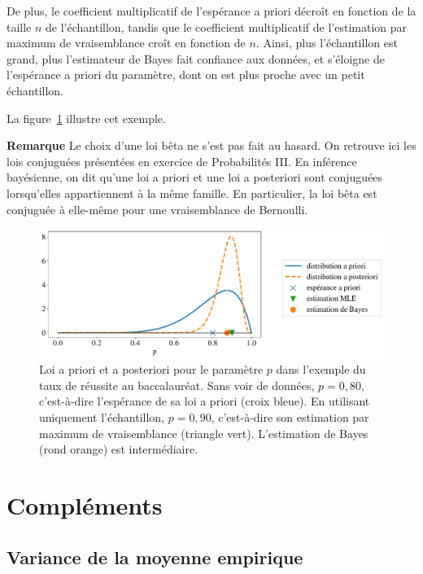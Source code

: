\begin{exemple}
  De plus, le coefficient multiplicatif de l'espérance a priori décroît en
  fonction de la taille $n$ de l'échantillon, tandis que le coefficient
  multiplicatif de l'estimation par maximum de vraisemblance croît en fonction
  de $n$. Ainsi, plus l'échantillon est grand, plus l'estimateur de Bayes fait
  confiance aux données, et s'éloigne de l'espérance a priori du paramètre,
  dont on est plus proche avec un petit échantillon.

  La figure~\ref{fig:bayes_estimate} illustre cet exemple.

  \textbf{Remarque} Le choix d'une loi bêta ne s'est pas fait au hasard. On
  retrouve ici les lois conjuguées présentées en exercice de Probabilités
  III. En inférence bayésienne, on dit qu'une loi a priori et une loi a
  posteriori sont conjuguées lorsqu'elles appartiennent à la même famille. En
  particulier, la loi bêta est conjuguée à elle-même pour une vraisemblance de
  Bernoulli.
\end{exemple}

\begin{figure}[h]
  \centering
  \includegraphics[width=\textwidth]{figures/estimation/bayes_estimate}
  \caption{Loi a priori et a posteriori pour le paramètre $p$ dans l'exemple du
    taux de réussite au baccalauréat. Sans voir de données, $p=0,80$,
    c'est-à-dire l'espérance de sa loi a priori (croix bleue). En utilisant
    uniquement l'échantillon, $p=0,90$, c'est-à-dire son estimation par maximum
    de vraisemblance (triangle vert). L'estimation de Bayes (rond orange) est
    intermédiaire.}
  \label{fig:bayes_estimate}
\end{figure}




\section{Compléments}
\subsection{Variance de la moyenne empirique} 
\label{sec:variance_moyenne_empirique}

